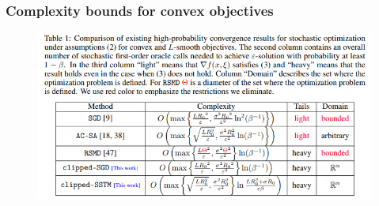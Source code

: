 \begin{frame}
    \frametitle{Complexity bounds for convex objectives}
    \begin{figure}[htpb]
        \begin{center}
            \includegraphics[width=\linewidth]
                {pics/appendix/table_1}
        \end{center}
    \end{figure}
\end{frame}
